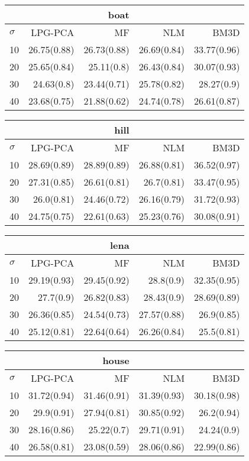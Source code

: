 \noindent\begin{minipage}{.5\linewidth}
\begin{tabular}{lrrrr}
\toprule &&boat\\ \midrule
$\sigma$&LPG-PCA&MF&NLM&BM3D\\
\midrule
10&26.75(0.88)&26.73(0.88)&26.69(0.84)&33.77(0.96)\\
20&25.65(0.84)&25.11(0.8)&26.43(0.84)&30.07(0.93)\\
30&24.63(0.8)&23.44(0.71)&25.78(0.82)&28.27(0.9)\\
40&23.68(0.75)&21.88(0.62)&24.74(0.78)&26.61(0.87)\\
\bottomrule
\end{tabular}
\end{minipage}
\noindent\begin{minipage}{.5\linewidth}
\begin{tabular}{lrrrr}
\toprule &&hill\\ \midrule
$\sigma$&LPG-PCA&MF&NLM&BM3D\\
\midrule
10&28.69(0.89)&28.89(0.89)&26.88(0.81)&36.52(0.97)\\
20&27.31(0.85)&26.61(0.81)&26.7(0.81)&33.47(0.95)\\
30&26.0(0.81)&24.46(0.72)&26.16(0.79)&31.72(0.93)\\
40&24.75(0.75)&22.61(0.63)&25.23(0.76)&30.08(0.91)\\
\bottomrule
\end{tabular}
\end{minipage}
\noindent\begin{minipage}{.5\linewidth}
\begin{tabular}{lrrrr}
\toprule &&lena\\ \midrule
$\sigma$&LPG-PCA&MF&NLM&BM3D\\
\midrule
10&29.19(0.93)&29.45(0.92)&28.8(0.9)&32.35(0.95)\\
20&27.7(0.9)&26.82(0.83)&28.43(0.9)&28.69(0.89)\\
30&26.36(0.85)&24.54(0.73)&27.57(0.88)&26.9(0.85)\\
40&25.12(0.81)&22.64(0.64)&26.26(0.84)&25.5(0.81)\\
\bottomrule
\end{tabular}
\end{minipage}
\noindent\begin{minipage}{.5\linewidth}
\begin{tabular}{lrrrr}
\toprule &&house\\ \midrule
$\sigma$&LPG-PCA&MF&NLM&BM3D\\
\midrule
10&31.72(0.94)&31.46(0.91)&31.39(0.93)&30.18(0.98)\\
20&29.9(0.91)&27.94(0.81)&30.85(0.92)&26.2(0.94)\\
30&28.16(0.86)&25.22(0.7)&29.71(0.91)&24.24(0.9)\\
40&26.58(0.81)&23.08(0.59)&28.06(0.86)&22.99(0.86)\\
\bottomrule
\end{tabular}
\end{minipage}
